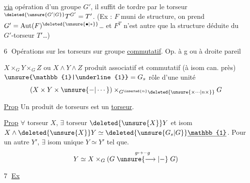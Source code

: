 \uline{via} opération d'un groupe $G'$, il suffit de tordre par le torseur ${}^{\deleted{\unsure{G'|G}}}T^{G'}=T'$. (Ex :  $F$ muni de  structure,  on prend $G'=\operatorname{Aut}(F)^{\deleted{\unsure{\bullet|\ast}}}$\ldots{} et $F^T$ n'est autre  que la structure déduite du $G'$-torseur $T'$\ldots)

\textcircled{6} Opérations  sur les torseurs sur groupe \uline{commutatif}. Op. à g ou à droite pareil

$X\times_G Y\times_G Z$ ou  $X\wedge Y\wedge Z$ produit associatif et commutatif (à isom can. près) $\unsure{\mathbb{1}|\underline{1}}=G_s$  rôle d'une unité
\[
 (X\times Y\times\unsure{-|\cdots})\times_{G^{\inserted{n}}\deleted{\unsure{\times\cdots|n\times}}}G
\]

\uline{Prop} Un produit de torseurs est un \uline{torseur}.


\uline{Prop} $\forall$ torseur $X$, $\exists$ torseur $\deleted{\unsure{X}}Y$ et isom $X\wedge\deleted{\unsure{X}}Y\simeq\deleted{\unsure{G_s|G}}\underline{\mathbb{1}}$. Pour un autre $Y'$, $\exists$ isom unique $Y\simeq Y'$ tel que.
\[
 Y\simeq X\times_G(G\overset{g\mapsto-g}{\mathrel{\unsure{\longrightarrow|-}}}G)
\]

\textcircled{7} \uline{Ex}  


